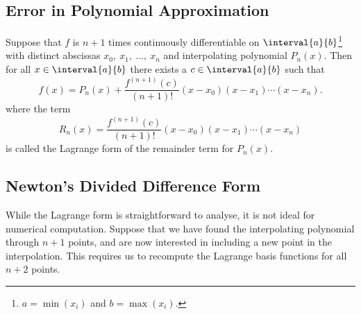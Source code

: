 \documentclass{article}
\begin{document}
\subsection{Error in Polynomial Approximation}
\begin{theorem}
    Suppose that \(f\) is \(n + 1\) times continuously \linebreak
    differentiable on \(\interval{a}{b}\)\footnote{\(a = \min \left( x_i \right)\)
        and \(b = \max \left( x_i \right)\).} with distinct abscissas
    \(x_0,\: x_1,\: \dots,\: x_n\) and interpolating polynomial
    \(P_n\left( x \right)\). Then for all \(x \in \interval{a}{b}\)
    there exists a \(c \in \interval{a}{b}\) such that
    \begin{equation*}
        f\left( x \right) = P_n\left( x \right) + \frac{f^{\left( n + 1 \right)} \left( c \right)}{\left( n + 1 \right)!} \left( x - x_0 \right) \left( x - x_1 \right) \cdots \left( x - x_n \right).
    \end{equation*}
    where the term
    \begin{equation*}
        R_n\left( x \right) = \frac{f^{\left( n + 1 \right)} \left( c \right)}{\left( n + 1 \right)!} \left( x - x_0 \right) \left( x - x_1 \right) \cdots \left( x - x_n \right)
    \end{equation*}
    is called the Lagrange form of the remainder term for
    \(P_n\left( x \right)\).
\end{theorem}
\subsection{Newton's Divided Difference Form}
While the Lagrange form is straightforward to analyse, it is not ideal
for numerical computation. Suppose that we have found the interpolating
polynomial through \(n + 1\) points, and are now interested in
including a new point in the interpolation. This requires us to
recompute the Lagrange basis functions for all \(n + 2\) points.
\end{document}
